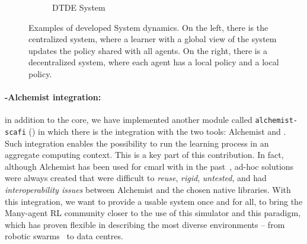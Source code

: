 \begin{figure}[t]
\begin{subfigure}[b]{0.49\textwidth}
        \caption{DTDE System}
        \label{coordination2023:fig:dtde}
    \end{subfigure}
\caption[Examples of developed System dynamics in \scarlib{}]{Examples of developed System dynamics. 
On the left, there is the centralized system, 
where a learner with a global view of the system 
updates the policy shared with all agents. 
%
On the right, there is a decentralized system, 
where each agent has a local policy and a local policy.}
\end{figure}

\paragraph{\scafi{}-Alchemist integration:} in addition to the core, we have implemented another module called \texttt{alchemist-scafi} () 
 in which there is the integration with the two tools: 
 Alchemist \cite{DBLP:journals/jos/PianiniMV13} and \scafi{} \cite{Casadei2022}.
%
Such integration enables the possibility to run the learning process 
 in an aggregate computing context.
This is a key part of this contribution. 
 In fact, although Alchemist has been used for \ac{cmarl} with \scafi{} in the past~\cite{Aguzzi2022,DBLP:conf/acsos/AguzziCV22}, 
 ad-hoc solutions were always created that were difficult to \emph{reuse}, 
 \emph{rigid}, \emph{untested}, and had \emph{interoperability issues} between Alchemist 
 and the chosen native libraries.
With this integration, 
 we want to provide a usable system once and for all, 
 to bring the Many-agent RL community closer 
 to the use of this simulator and this paradigm, 
 which has proven flexible in describing the most diverse environments -- 
 from robotic swarms~\cite{Casadei2021} to data centres.

